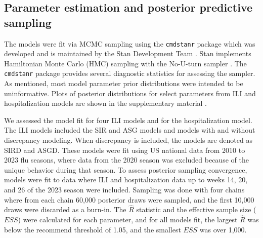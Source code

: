 \subsection{Parameter estimation and posterior predictive sampling}
\label{sec:implementation_posterior}

The models were fit via MCMC sampling using the 
\texttt{cmdstanr} package which was developed and is maintained by the Stan 
Development Team \cite[]{stan2024manual} \cite[]{gabry2022stan}. Stan 
implements Hamiltonian Monte Carlo (HMC) sampling with the No-U-turn 
sampler \cite[]{hoffman2014no}. The \texttt{cmdstanr} package provides 
several diagnostic statistics for assessing the sampler.
As mentioned, most model parameter prior distributions were intended to be 
uninformative.
Plots of posterior distributions for select parameters from ILI and 
hospitalization models are shown in the supplementary material 
\cite[]{wadsworth2024bas}.

We assessed the model fit for four ILI models and for 
the hospitalization model. The ILI models included the SIR and 
ASG models and models with and without discrepancy modeling. When discrepancy 
is included, the models are denoted as SIRD and ASGD. These models were fit 
using US national data from 2010 to 2023 flu seasons, where data from the 
2020 season was excluded because of the unique behavior during that season. 
To assess posterior sampling convergence, models 
were fit to data where ILI and hospitalization data up to weeks 14, 20, and 26
of the 2023 
season were included. Sampling was done with four chains where from each chain 
60,000 posterior draws were sampled, and the first 10,000 draws were discarded 
as a burn-in. The $\hat{R}$ statistic \cite[]{vehtari2021rank} and the 
effective sample size ($ESS$) \cite[]{gelman2013bayesian} were calculated for 
each parameter, and for all models fit, the largest $\hat{R}$ was below the 
recommend threshold of 1.05, and the smallest $ESS$ was over 1,000.

